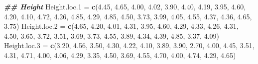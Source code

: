 \documentclass[
]{book}
\newenvironment{Shaded}{\begin{snugshade}}{\end{snugshade}}
\newcommand{\DocumentationTok}[1]{\textcolor[rgb]{0.56,0.35,0.01}{\textbf{\textit{#1}}}}
\newcommand{\FloatTok}[1]{\textcolor[rgb]{0.00,0.00,0.81}{#1}}
\newcommand{\FunctionTok}[1]{\textcolor[rgb]{0.13,0.29,0.53}{\textbf{#1}}}
\newcommand{\NormalTok}[1]{#1}
\newcommand{\OtherTok}[1]{\textcolor[rgb]{0.56,0.35,0.01}{#1}}
\begin{document}
\begin{Shaded}
\begin{Highlighting}[]
\DocumentationTok{\#\# Height}
\NormalTok{Height.loc}\FloatTok{.1} \OtherTok{=} \FunctionTok{c}\NormalTok{(}\FloatTok{4.45}\NormalTok{, }\FloatTok{4.65}\NormalTok{, }\FloatTok{4.00}\NormalTok{, }\FloatTok{4.02}\NormalTok{, }\FloatTok{3.90}\NormalTok{, }\FloatTok{4.40}\NormalTok{, }\FloatTok{4.19}\NormalTok{, }\FloatTok{3.95}\NormalTok{, }\FloatTok{4.60}\NormalTok{, }\FloatTok{4.20}\NormalTok{, }\FloatTok{4.10}\NormalTok{, }
                 \FloatTok{4.72}\NormalTok{, }\FloatTok{4.26}\NormalTok{, }\FloatTok{4.85}\NormalTok{, }\FloatTok{4.29}\NormalTok{, }\FloatTok{4.85}\NormalTok{, }\FloatTok{4.50}\NormalTok{, }\FloatTok{3.73}\NormalTok{, }\FloatTok{3.99}\NormalTok{, }\FloatTok{4.05}\NormalTok{, }\FloatTok{4.55}\NormalTok{, }\FloatTok{4.37}\NormalTok{, }
                 \FloatTok{4.36}\NormalTok{, }\FloatTok{4.65}\NormalTok{, }\FloatTok{3.75}\NormalTok{)}
\NormalTok{Height.loc}\FloatTok{.2} \OtherTok{=} \FunctionTok{c}\NormalTok{(}\FloatTok{4.65}\NormalTok{, }\FloatTok{4.20}\NormalTok{, }\FloatTok{4.01}\NormalTok{, }\FloatTok{4.31}\NormalTok{, }\FloatTok{3.95}\NormalTok{, }\FloatTok{4.60}\NormalTok{, }\FloatTok{4.29}\NormalTok{, }\FloatTok{4.33}\NormalTok{, }\FloatTok{4.26}\NormalTok{, }\FloatTok{4.31}\NormalTok{, }\FloatTok{4.50}\NormalTok{, }
                 \FloatTok{3.65}\NormalTok{, }\FloatTok{3.72}\NormalTok{, }\FloatTok{3.51}\NormalTok{, }\FloatTok{3.69}\NormalTok{, }\FloatTok{3.73}\NormalTok{, }\FloatTok{4.55}\NormalTok{, }\FloatTok{3.89}\NormalTok{, }\FloatTok{4.34}\NormalTok{, }\FloatTok{4.39}\NormalTok{, }\FloatTok{4.85}\NormalTok{, }\FloatTok{3.37}\NormalTok{, }
                 \FloatTok{4.09}\NormalTok{)}
\NormalTok{Height.loc}\FloatTok{.3} \OtherTok{=} \FunctionTok{c}\NormalTok{(}\FloatTok{3.20}\NormalTok{, }\FloatTok{4.56}\NormalTok{, }\FloatTok{3.50}\NormalTok{, }\FloatTok{4.30}\NormalTok{, }\FloatTok{4.22}\NormalTok{, }\FloatTok{4.10}\NormalTok{, }\FloatTok{3.89}\NormalTok{, }\FloatTok{3.90}\NormalTok{, }\FloatTok{2.70}\NormalTok{, }\FloatTok{4.00}\NormalTok{, }\FloatTok{4.45}\NormalTok{, }
                 \FloatTok{3.51}\NormalTok{, }\FloatTok{4.31}\NormalTok{, }\FloatTok{4.71}\NormalTok{, }\FloatTok{4.00}\NormalTok{, }\FloatTok{4.06}\NormalTok{, }\FloatTok{4.29}\NormalTok{, }\FloatTok{3.35}\NormalTok{, }\FloatTok{4.50}\NormalTok{, }\FloatTok{3.69}\NormalTok{, }\FloatTok{4.55}\NormalTok{, }\FloatTok{4.70}\NormalTok{, }
                 \FloatTok{4.00}\NormalTok{, }\FloatTok{4.74}\NormalTok{, }\FloatTok{4.29}\NormalTok{, }\FloatTok{4.65}\NormalTok{)}
\end{Highlighting}
\end{Shaded}
\end{document}
